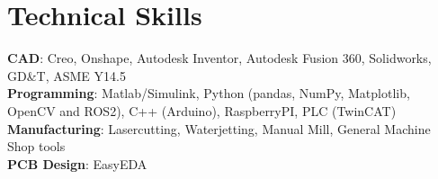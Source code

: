 \documentclass[letterpaper,11pt]{article}
\begin{document}
\section{Technical Skills}
 \begin{itemize}[leftmargin=0.15in, label={}]
    \small{\item{
     \textbf{CAD}{: Creo, Onshape, Autodesk Inventor, Autodesk Fusion 360, Solidworks, GD\&T, ASME Y14.5}  \\
     \textbf{Programming}{: Matlab/Simulink, Python (pandas, NumPy, Matplotlib, OpenCV and ROS2), C++ (Arduino), RaspberryPI, PLC (TwinCAT)} \\
     \textbf{Manufacturing}{: Lasercutting, Waterjetting, Manual Mill, General Machine Shop tools} \\
     \textbf{PCB Design}{: EasyEDA} \\
    }}
 \end{itemize}
\end{document}
